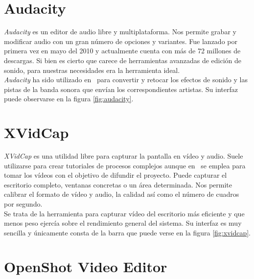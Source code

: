 

\section*{Audacity}

\textit{Audacity} \cite{website:audacity} es un editor de audio libre y
multiplataforma. Nos permite grabar y modificar audio con un gran número
de opciones y variantes. Fue lanzado por primera vez en mayo del 2010
y actualmente cuenta con más de 72 millones de descargas. Si bien es cierto
que carece de herramientas avanzadas de edición de sonido, para nuestras
necesidades era la herramienta ideal.\\

\textit{Audacity} ha sido utilizado en \juego\ para convertir y retocar
los efectos de sonido y las pistas de la banda sonora que envían los
correspondientes artistas. Su interfaz puede observarse en la figura
\ref{fig:audacity}.\\


\section*{XVidCap}

\textit{XVidCap} \cite{website:xvidcap} es una utilidad libre para capturar
la pantalla en vídeo y audio. Suele utilizarse para crear tutoriales de procesos
complejos aunque en \juego\ se emplea para tomar los vídeos con el objetivo
de difundir el proyecto. Puede capturar el escritorio completo, ventanas
concretas o un área determinada. Nos permite calibrar el formato de vídeo
y audio, la calidad así como el número de cuadros por segundo.\\

Se trata de la herramienta para capturar vídeo del escritorio más eficiente
y que menos peso ejercía sobre el rendimiento general del sistema. Su interfaz
es muy sencilla y únicamente consta de la barra que puede verse en la figura
\ref{fig:xvidcap}.\\


\section*{OpenShot Video Editor}

